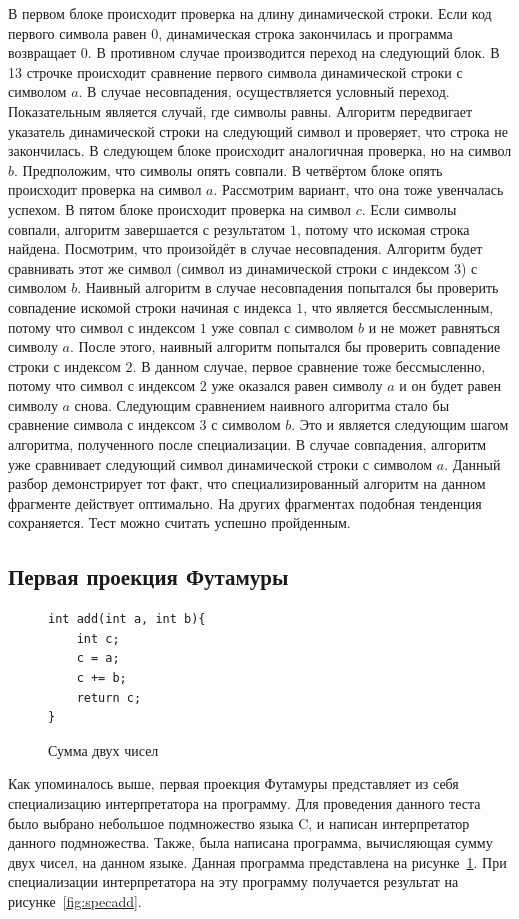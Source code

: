 В первом блоке происходит проверка на длину динамической строки. Если код первого символа равен $0$, динамическая строка закончилась и программа возвращает $0$. В противном случае производится переход на следующий блок. В 13 строчке происходит сравнение первого символа динамической строки с символом $a$. В случае несовпадения, осуществляется условный переход. Показательным является случай, где символы равны. Алгоритм передвигает указатель динамической строки на следующий символ и проверяет, что строка не закончилась. В следующем блоке происходит аналогичная проверка, но на символ $b$. Предположим, что символы опять совпали. В четвёртом блоке опять происходит проверка на символ $a$. Рассмотрим вариант, что она тоже увенчалась успехом. В пятом блоке происходит проверка на символ $c$. Если символы совпали, алгоритм завершается с результатом $1$, потому что искомая строка найдена. Посмотрим, что произойдёт в случае несовпадения. Алгоритм будет сравнивать этот же символ (символ из динамической строки с индексом 3) с символом $b$. Наивный алгоритм в случае несовпадения попытался бы проверить совпадение искомой строки начиная с индекса $1$, что является бессмысленным, потому что символ с индексом $1$ уже совпал с символом $b$ и не может равняться символу $a$.
После этого, наивный алгоритм попытался бы проверить совпадение строки с индексом $2$. В данном случае, первое сравнение тоже бессмысленно, потому что символ с индексом $2$ уже оказался равен символу $a$ и он будет равен символу $a$ снова. Следующим сравнением наивного алгоритма стало бы сравнение символа с индексом $3$ с символом $b$. Это и является следующим шагом алгоритма, полученного после специализации. В случае совпадения, алгоритм уже сравнивает следующий символ динамической строки с символом $a$. Данный разбор демонстрирует тот факт, что специализированный алгоритм на данном фрагменте действует оптимально. На других фрагментах подобная тенденция сохраняется. Тест можно считать успешно пройденным.

\subsection{ Первая проекция Футамуры}

\begin{figure}
\vspace{-1cm}
\begin{lstlisting}[xleftmargin = 20pt]
int add(int a, int b){
    int c;
    c = a;
    c += b;
    return c;
}
\end{lstlisting}
\caption{Сумма двух чисел}
\vspace{-0.7cm}
\label{fig:add}
\end{figure}
Как упоминалось выше, первая проекция Футамуры представляет из себя специализацию интерпретатора на программу. Для проведения данного теста было выбрано небольшое подмножество языка \textsf{C}, и написан интерпретатор данного подмножества. Также, была написана программа, вычисляющая сумму двух чисел, на данном языке. Данная программа представлена на рисунке~\ref{fig:add}.
При специализации интерпретатора на эту программу получается результат на рисунке~\ref{fig:specadd}.

